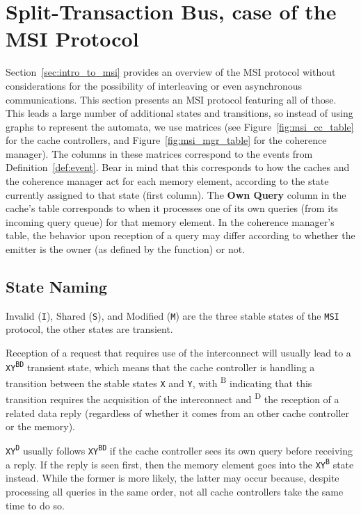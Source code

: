 \section{Split-Transaction Bus, case of the MSI Protocol}
\label{sec:split_msi}
Section~\ref{sec:intro_to_msi} provides an overview of the MSI protocol without
considerations for the possibility of interleaving or even asynchronous
communications. This section presents an MSI protocol featuring all of those.
This leads a large number of additional states and transitions, so instead of
using graphs to represent the automata, we use matrices (see
Figure~\ref{fig:msi_cc_table} for the cache controllers, and
Figure~\ref{fig:msi_mgr_table} for the coherence manager). The columns in
these matrices correspond to the events from Definition~\ref{def:event}. Bear
in mind that this corresponds to how the caches and the coherence manager act
for each memory element, according to the state currently assigned to that
state (first column). The \textbf{Own Query} column in the cache's
table corresponds to when it processes one of its own queries (from its incoming
query queue) for that memory element. In the coherence manager's table, the
behavior upon reception of a query may differ according to whether the emitter
is the owner (as defined by the \coherencemanagerownerfun{} function) or not.

\subsection{State Naming}
\label{sec:cache_state_naming}
Invalid (\texttt{I}), Shared (\texttt{S}), and Modified (\texttt{M}) are the
three stable states of the \texttt{MSI} protocol, the other states are
transient.

Reception of a request that requires use of the interconnect will usually lead
to a \texttt{XY\textsuperscript{BD}} transient state, which means that the
cache controller is handling a transition between the stable states \texttt{X}
and \texttt{Y}, with \textsuperscript{B} indicating that this transition
requires the acquisition of the interconnect and \textsuperscript{D} the
reception of a related data reply (regardless of whether it comes from an other
cache controller or the memory).

\texttt{XY\textsuperscript{D}} usually follows \texttt{XY\textsuperscript{BD}}
if the cache controller sees its own query before receiving a reply. If the
reply is seen first, then the memory element goes into the
\texttt{XY\textsuperscript{B}} state instead. While the former is more likely,
the latter may occur because, despite processing all queries in the same order,
not all cache controllers take the same time to do so.

